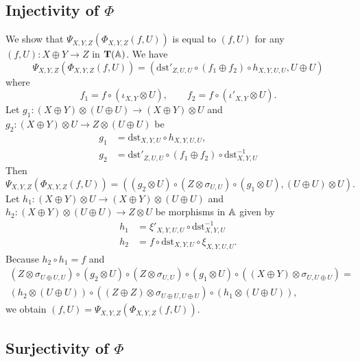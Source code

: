 \subsection{Injectivity of $\Phi$}

We show that $\Psi_{X,Y,Z}(\Phi_{X,Y,Z}(f,U))$ is equal to $(f,U)$ for
any $(f,U) \colon X \oplus Y \to Z$ in $\mathbf T(\mathbb{A})$. We have
\begin{equation*}
  \Psi_{X,Y,Z}(\Phi_{X,Y,Z}(f,U)) =
  (\mathrm{dst}'_{Z,U,U} \circ (f_{1} \oplus f_{2}) \circ h_{X,Y,U,U}, U \oplus U)
\end{equation*}
where
\begin{equation*}
  f_{1} = f \circ (\iota_{X,Y} \otimes U), \qquad
  f_{2} = f \circ (\iota'_{X,Y} \otimes U).
\end{equation*}
Let $g_{1} \colon (X \oplus Y) \otimes (U \oplus U) \to (X \oplus Y) \otimes U$
and $g_{2} \colon (X \oplus Y) \otimes U \to Z \otimes (U \oplus U)$ be
\begin{align*}
  g_{1} &= \mathrm{dst}_{X,Y,U} \circ h_{X,Y,U,U}, \\
  g_{2} &= \mathrm{dst}'_{Z,U,U} \circ (f_{1} \oplus f_{2}) \circ \mathrm{dst}_{X,Y,U}^{-1}
\end{align*}
Then
\begin{equation*}
  \Psi_{X,Y,Z}(\Phi_{X,Y,Z}(f,U))
  = ((g_{2} \otimes U) \circ (Z \otimes \sigma_{U,U}) \circ (g_{1} \otimes U),
  (U \oplus U) \otimes U).
\end{equation*}
Let $h_{1} \colon (X \oplus Y) \otimes U \to (X \oplus Y) \otimes (U \oplus U)$
and $h_{2} \colon (X \oplus Y) \otimes (U \oplus U) \to Z \otimes U$ be
morphisms in $\mathbb{A}$ given by
\begin{align*}
  h_{1} &= \xi'_{X,Y,U,U} \circ \mathrm{dst}_{X,Y,U}^{-1} \\
  h_{2} &= f \circ \mathrm{dst}_{X,Y,U} \circ \xi_{X,Y,U,U}.
\end{align*}
Because $h_{2} \circ h_{1} = f$ and
\begin{multline*}
  (Z \otimes \sigma_{U \oplus U,U}) \circ
  (g_{2} \otimes U) \circ (Z \otimes \sigma_{U,U}) \circ (g_{1} \otimes U)
  \circ ((X \oplus Y) \otimes \sigma_{U,U \oplus U})
  = \\
  (h_{2} \otimes (U \oplus U)) \circ ((Z \oplus Z) \otimes \sigma_{U \oplus U,U \oplus U})
  \circ (h_{1} \otimes (U \oplus U)),
\end{multline*}
we obtain $(f,U) = \Psi_{X,Y,Z} (\Phi_{X,Y,Z}(f,U))$.

\subsection{Surjectivity of $\Phi$}

